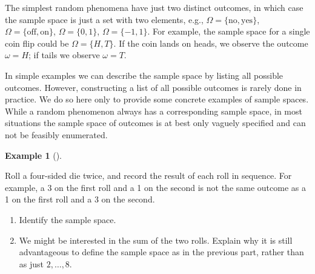 \documentclass[
  letterpaper,
  DIV=11,
  numbers=noendperiod]{scrreprt}
\theoremstyle{plain}
\theoremstyle{definition}
\newtheorem{example}{Example}[chapter]
\theoremstyle{definition}
\theoremstyle{definition}
\theoremstyle{remark}
\begin{document}
The simplest random phenomena have just two distinct outcomes, in which
case the sample space is just a set with two elements, e.g.,
\(\Omega=\{\text{no}, \text{yes}\}\),
\(\Omega=\{\text{off}, \text{on}\}\), \(\Omega=\{0, 1\}\),
\(\Omega=\{-1, 1\}\). For example, the sample space for a single coin
flip could be \(\Omega = \{H, T\}\). If the coin lands on heads, we
observe the outcome \(\omega = H\); if tails we observe \(\omega=T\).

In simple examples we can describe the sample space by listing all
possible outcomes. However, constructing a list of all possible outcomes
is rarely done in practice. We do so here only to provide some concrete
examples of sample spaces. While a random phenomenon always has a
corresponding sample space, in most situations the sample space of
outcomes is at best only vaguely specified and can not be feasibly
enumerated.

\begin{tcolorbox}[enhanced jigsaw, opacityback=0, left=2mm, colframe=quarto-callout-note-color-frame, toprule=.15mm, breakable, colback=white, leftrule=.75mm, arc=.35mm, rightrule=.15mm, bottomrule=.15mm]

\begin{example}[]\protect\hypertarget{exm-dice-outcome}{}\label{exm-dice-outcome}

Roll a four-sided die twice, and record the result of each roll in
sequence. For example, a 3 on the first roll and a 1 on the second is
not the same outcome as a 1 on the first roll and a 3 on the second.

\begin{enumerate}
\def\labelenumi{\arabic{enumi}.}
\item
  Identify the sample space.
\item
  We might be interested in the sum of the two rolls. Explain why it is
  still advantageous to define the sample space as in the previous part,
  rather than as just \(2, \ldots, 8\).
\end{enumerate}

\end{example}

\end{tcolorbox}
\end{document}
